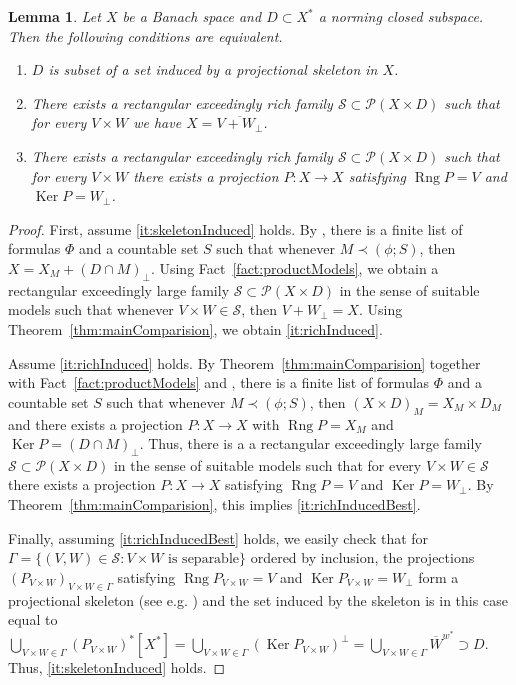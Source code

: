 \documentclass[11pt]{amsart}
\newtheorem{lemma}[thm]{Lemma}
\theoremstyle{definition}
\theoremstyle{remark}
\newcommand{\PP}{\mathcal P}
\newcommand{\SSS}{\mathcal S}
\def \rng {\operatorname{Rng}}
\def \ker {\operatorname{Ker}}
\begin{document}
\begin{lemma}\label{lem:skeleton}Let $X$ be a Banach space and $D\subset X^*$ a norming closed subspace. Then the following conditions are equivalent.
\begin{enumerate}[label=\textnormal{(\roman*)}]
    \item\label{it:skeletonInduced} $D$ is subset of a set induced by a projectional skeleton in $X$.
    \item\label{it:richInduced} There exists a rectangular exceedingly rich family $\SSS\subset \PP(X\times D)$ such that for every $V\times W$ we have $X = \overline{V + W_\perp}$.
    \item\label{it:richInducedBest} There exists a rectangular exceedingly rich family $\SSS\subset \PP(X\times D)$ such that for every $V\times W$ there exists a projection $P:X\to X$ satisfying $\rng P = V$ and $\ker P = W_\perp$.
\end{enumerate}
\end{lemma}
\begin{proof}First, assume \ref{it:skeletonInduced} holds. By \cite[Lemma 15 and Proposition 16]{CCS}, there is a finite list of formulas $\Phi$ and a countable set $S$ such that whenever $M\prec (\phi;S)$, then $X = X_M + (D\cap M)_\perp$. Using Fact~\ref{fact:productModels}, we obtain a rectangular exceedingly large  family $\SSS\subset\PP(X\times D)$ in the sense of suitable models such that whenever $V\times W\in \SSS$, then $V + W_\perp = X$. Using Theorem~\ref{thm:mainComparision}, we obtain \ref{it:richInduced}.

Assume \ref{it:richInduced} holds. By Theorem~\ref{thm:mainComparision} together with Fact~\ref{fact:productModels} and \cite[Lemma 15]{CCS}, there is a finite list of formulas $\Phi$ and a countable set $S$ such that whenever $M\prec (\phi;S)$, then $(X\times D)_M = X_M\times D_M$ and there exists a projection $P:X\to X$ with $\rng P = X_M$ and $\ker P = (D\cap M)_\perp$. Thus, there is a a rectangular exceedingly large  family $\SSS\subset\PP(X\times D)$ in the sense of suitable models such that for every $V\times W\in \SSS$ there exists a projection $P:X\to X$ satisfying $\rng P = V$ and $\ker P = W_\perp$. By Theorem~\ref{thm:mainComparision}, this implies \ref{it:richInducedBest}.

Finally, assuming \ref{it:richInducedBest} holds, we easily check that for $\Gamma = \{(V,W)\in \SSS\colon V\times W\text{ is separable}\}$ ordered by inclusion, the projections $(P_{V\times W})_{V\times W\in\Gamma}$ satisfying $\rng P_{V\times W} = V$ and $\ker P_{V\times W} = W_\perp$ form a projectional skeleton (see e.g. \cite[Definition 1]{CCS}) and the set induced by the skeleton is in this case equal to $\bigcup_{V\times W\in \Gamma} (P_{V\times W})^*[X^*] = \bigcup_{V\times W\in \Gamma} (\ker P_{V\times W})^\perp
 = \bigcup_{V\times W\in \Gamma} \overline{W}^{w^*}\supset D$. Thus, \ref{it:skeletonInduced} holds.
\end{proof}
\end{document}

